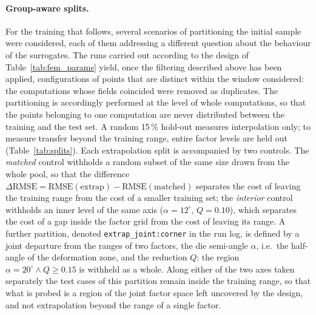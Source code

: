 \documentclass[subscriptcorrection,upint,varvw,barcolor=Goldenrod3,mathalfa=cal=euler,balance,hyphenate,french,pdf-a]{asmejour} %
\begin{document}
\paragraph{Group-aware splits.}
For the training that follows, several scenarios of partitioning the initial sample were considered, each of them addressing a different question about the behaviour of the surrogates.
The runs carried out according to the design of Table~\ref{tab:fem_params} yield, once the filtering described above has been applied, configurations of points that are distinct within the window considered: the computations whose fields coincided were removed as duplicates. The partitioning is accordingly performed at the level of whole computations, so that the points belonging to one computation are never distributed between the training and the test set. %
A random 15\,\% hold-out measures interpolation only; to measure transfer beyond the training range, entire factor levels are held out (Table~\ref{tab:splits}). %
Each extrapolation split is accompanied by two controls. The \emph{matched} control withholds a random subset of the same size drawn from the whole pool, so that the difference $\Delta\mathrm{RMSE} = \mathrm{RMSE}(\text{extrap}) - \mathrm{RMSE}(\text{matched})$ separates the cost of leaving the training range from the cost of a smaller training set; %
the \emph{interior} control withholds an inner level of the same axis ($\alpha = 12^\circ$, $Q = 0.10$), which separates the cost of a gap inside the factor grid from the cost of leaving its range. %
A further partition, denoted \texttt{extrap\_joint:corner} in the run log, is defined by a joint departure from the ranges of two factors, the die semi-angle $\alpha$, i.e.\ the half-angle of the deformation zone, and the reduction $Q$: the region $\alpha = 20^\circ \wedge Q \ge 0.15$ is withheld as a whole. Along either of the two axes taken separately the test cases of this partition remain inside the training range, so that what is probed is a region of the joint factor space left uncovered by the design, and not extrapolation beyond the range of a single factor. %
\end{document}
